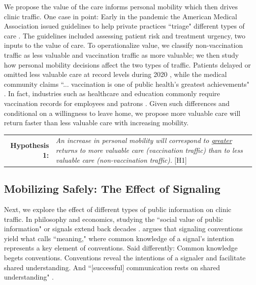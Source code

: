  We propose the value of the care informs personal mobility which then drives clinic traffic. One case in point: Early in the pandemic the American Medical Association issued guidelines to help private practices “triage" different types of care \citep{AmericanMedicalAssociation2020}. The guidelines included assessing patient risk and treatment urgency, two inputs to the value of care. To operationalize value, we classify non-vaccination traffic as less valuable and vaccination traffic as more valuable; we then study how personal mobility decisions affect the two types of traffic. Patients delayed or omitted less valuable care at record levels during 2020 \citep{WSJ_pcp,WSJ_skipDoc}, while the medical community claims “... vaccination is one of public health’s greatest achievements" \citep[p. 190]{Brewer2017}. In fact, industries such as healthcare and education commonly require vaccination records for employees and patrons \citep{CDC_stateVaccReq}. Given such differences and conditional on a willingness to leave home, we propose more valuable care will return faster than less valuable care with increasing mobility.

 \medskip \noindent
 \begin{tabularx}{\linewidth}{ r X }
    \textbf{Hypothesis 1:} & \textit{An increase in personal mobility will correspond to \underline{greater} returns to more valuable care (vaccination traffic) than to less valuable care (non-vaccination traffic).} [H1]
 \end{tabularx}   %

\subsection{Mobilizing Safely: The Effect of Signaling}
 Next, we explore the effect of different types of public information on clinic traffic. In philosophy and economics, studying the “social value of public information" or signals extend back decades \citep[p. 1]{Morris2002}. \cite{Lewis1969} argues that signaling conventions yield what \cite{Grice1957} calls “meaning," where common knowledge of a signal's intention represents a key element of conventions. Said differently: Common knowledge begets conventions. Conventions reveal the intentions of a signaler and facilitate shared understanding. And “[successful] communication rests on shared understanding" \citep[p. 594]{Morris2007}.
 

